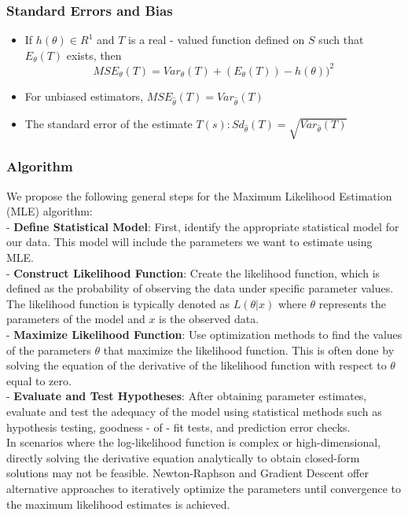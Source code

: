 \documentclass[12pt]{article}
\begin{document}
	\subsubsection{Standard Errors and Bias}
	\begin{itemize}
		\item If $h(\theta) \in R^{1}$ and $T$ is a real - valued function defined on $S$ such that $E_{\theta}(T)$ exists, then
		$$MSE_{\theta}(T) = Var_{\theta}(T) + (E_{\theta}(T)) - h(\theta))^{2}$$
		
		\item For unbiased estimators, $MSE_{\hat{\theta}}(T) = Var_{\hat{\theta}}(T)$
		
		\item The standard error of the estimate $T(s): Sd_{\hat{\theta}}(T) = \sqrt{Var_{\hat{\theta}}(T)}$	
				
	\end{itemize}
	
	\subsubsection{Algorithm}
	We propose the following general steps for the Maximum Likelihood Estimation (MLE) algorithm:
	\\
	- \textbf{Define Statistical Model}: First, identify the appropriate statistical model for our data. This model will include the parameters we want to estimate using MLE.
	\\
	- \textbf{Construct Likelihood Function}: Create the likelihood function, which is defined as the probability of observing the data under specific parameter values. The likelihood function is typically denoted as $L(\theta|x)$ where $\theta$ represents the parameters of the model and $x$ is the observed data.
	\\
	- \textbf{Maximize Likelihood Function}: Use optimization methods to find the values of the parameters $\theta$ that maximize the likelihood function. This is often done by solving the equation of the derivative of the likelihood function with respect to $\theta$ equal to zero.
	\\
	- \textbf{Evaluate and Test Hypotheses}: After obtaining parameter estimates, evaluate and test the adequacy of the model using statistical methods such as hypothesis testing, goodness - of - fit tests, and prediction error checks.
	\\
	
	In scenarios where the log-likelihood function is complex or high-dimensional, directly solving the derivative equation analytically to obtain closed-form solutions may not be feasible. Newton-Raphson and Gradient Descent offer alternative approaches to iteratively optimize the parameters until convergence to the maximum likelihood estimates is achieved.
\end{document}

